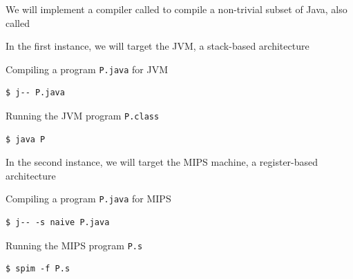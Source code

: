 \documentclass[8pt,a4paper,compress]{beamer}
\begin{document}
\begin{frame}[fragile]
\pause\transdissolve

We will implement a compiler called \jmm to compile a non-trivial subset of Java, also called \jmm

\pause\transdissolve\bigskip

In the first instance, we will target the JVM, a stack-based architecture

\pause\transdissolve\bigskip

Compiling a \jmm program \lstinline{P.java} for JVM
\begin{tcolorbox}[enhanced,drop shadow southwest,sharp corners,size=fbox,colback=black]
\begin{lstlisting}[style=terminal]
$ j-- P.java
\end{lstlisting}
\end{tcolorbox}

\pause\transdissolve\bigskip

Running the JVM program \lstinline{P.class}
\begin{tcolorbox}[enhanced,drop shadow southwest,sharp corners,size=fbox,colback=black]
\begin{lstlisting}[style=terminal]
$ java P
\end{lstlisting}
\end{tcolorbox}

\pause\transdissolve\bigskip

In the second instance, we will target the MIPS machine, a register-based architecture

\pause\transdissolve\bigskip

Compiling a \jmm program \lstinline{P.java} for MIPS
\begin{tcolorbox}[enhanced,drop shadow southwest,sharp corners,size=fbox,colback=black]
\begin{lstlisting}[style=terminal]
$ j-- -s naive P.java
\end{lstlisting}
\end{tcolorbox}

\pause\transdissolve\bigskip

Running the MIPS program \lstinline{P.s}

\begin{tcolorbox}[enhanced,drop shadow southwest,sharp corners,size=fbox,colback=black]
\begin{lstlisting}[style=terminal]
$ spim -f P.s
\end{lstlisting}
\end{tcolorbox}
\end{frame}
\end{document}
